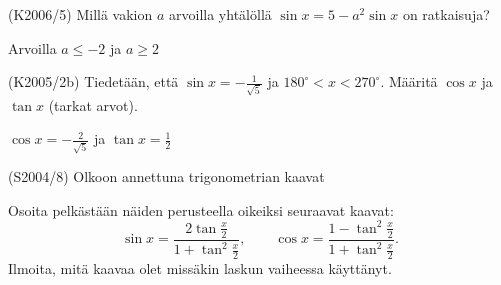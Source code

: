 \begin{tehtava} (K2006/5)
	Millä vakion $a$ arvoilla yhtälöllä $\sin x=5-a^2\sin x$ on ratkaisuja?
		\begin{vastaus}
			Arvoilla $a\leq-2$ ja $a\geq2$
		\end{vastaus}
\end{tehtava}

\begin{tehtava} (K2005/2b)
	Tiedetään, että $\sin x=-\frac{1}{\sqrt{5}}$ ja $180^{\circ}<x<270^{\circ}$. Määritä $\cos x$ 
	ja $\tan x$ (tarkat arvot).
		\begin{vastaus}
			$\cos x=-\frac{2}{\sqrt{5}}$ \; ja \; $\tan x=\frac{1}{2}$
		\end{vastaus}
\end{tehtava}

\begin{tehtava} (S2004/8)
	Olkoon annettuna trigonometrian kaavat 
		\begin{alakohdat}
		\end{alakohdat}
	Osoita pelkästään näiden perusteella oikeiksi seuraavat kaavat: 
	\[\sin x=\frac{2\tan\frac{x}{2}}{1+\tan^2\frac{x}{2}}, \qquad \cos x=\frac{1-\tan^2\frac{x}{2}}{1+\tan^2\frac{x}{2}}.\]
	Ilmoita, mitä kaavaa olet missäkin laskun vaiheessa käyttänyt.
\end{tehtava}


